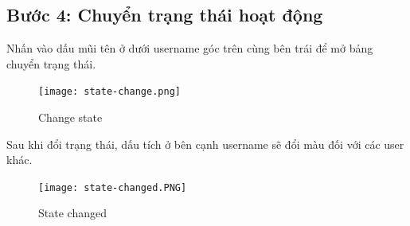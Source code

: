 \documentclass[a4paper]{article}
\begin{document}
	\subsection{Bước 4: Chuyển trạng thái hoạt động}
	Nhấn vào dấu mũi tên ở dưới username góc trên cùng bên trái để mở bảng chuyển trạng thái.
	\begin{figure}[H]
		\centering
		\texttt{[image: state-change.png]}
		\caption{Change state}
		\label{fig:my_label}
	\end{figure}
	Sau khi đổi trạng thái, dấu tích ở bên cạnh username sẽ đổi màu đối với các user khác.
	\begin{figure}[H]
		\centering
		\texttt{[image: state-changed.PNG]}
		\caption{State changed}
		\label{fig:my_label}
	\end{figure}
\end{document}

